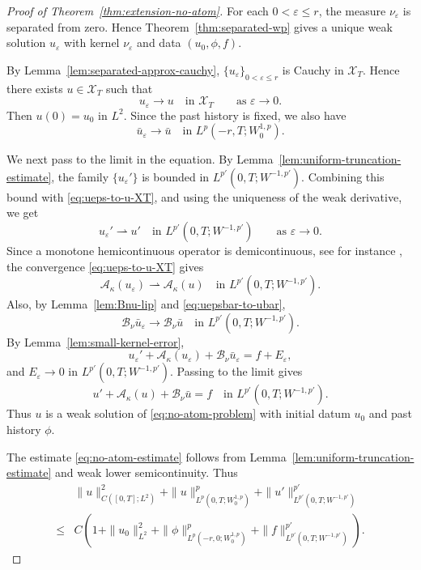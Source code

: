 \documentclass[a4paper,11pt,oneside,reqno]{amsart}
\newcounter{c}
\newcounter{d}
\newcounter{b}
\newcommand{\e}{\varepsilon}
\begin{document}
\begin{proof}[Proof of Theorem~\ref{thm:extension-no-atom}]
For each \(0<\e\le r\), the measure \(\nu_\e\) is separated from zero.
Hence Theorem~\ref{thm:separated-wp} gives a unique weak solution \(u_\e\)
with kernel \(\nu_\e\) and data \((u_0,\phi,f)\).

By Lemma~\ref{lem:separated-approx-cauchy}, \(\{u_\e\}_{0<\e\le r}\) is
Cauchy in \(\mathcal X_T\). Hence there exists \(u\in\mathcal X_T\) such that
\begin{equation}
 u_\e\to u
 \quad\text{in }\mathcal X_T
 \qquad\text{as }\e\to0 .
 \label{eq:ueps-to-u-XT}
\end{equation}
Then \(u(0)=u_0\) in \(L^2\). Since the past history is fixed, we also have
\begin{equation}
 \bar u_\e\to\bar u
 \quad\text{in }L^p(-r,T;W^{1,p}_0).
 \label{eq:uepsbar-to-ubar}
\end{equation}

We next pass to the limit in the equation. By
Lemma~\ref{lem:uniform-truncation-estimate}, the family \(\{u_\e'\}\) is
bounded in \(L^{p'}(0,T;W^{-1,p'})\). Combining this bound with
\eqref{eq:ueps-to-u-XT}, and using the uniqueness of the weak derivative, we
get
\[
 u_\e'\rightharpoonup u'
 \quad\text{in }L^{p'}(0,T;W^{-1,p'})
 \qquad\text{as }\e\to0 .
\]
Since a monotone hemicontinuous operator is demicontinuous, see for instance
\cite[Chapter~II, Section~2]{Showalter1997MonotoneOperatorsBanachSpaceNonlinearPDE}, the convergence
\eqref{eq:ueps-to-u-XT} gives
\[
 \mathcal A_\kappa(u_\e)
 \rightharpoonup
 \mathcal A_\kappa(u)
 \quad\text{in }L^{p'}(0,T;W^{-1,p'}).
\]
Also, by Lemma~\ref{lem:Bnu-lip} and \eqref{eq:uepsbar-to-ubar},
\[
 \mathcal B_\nu\bar u_\e
 \to
 \mathcal B_\nu\bar u
 \quad\text{in }L^{p'}(0,T;W^{-1,p'}).
\]
By Lemma~\ref{lem:small-kernel-error},
\[
 u_\e'
 +
 \mathcal A_\kappa(u_\e)
 +
 \mathcal B_\nu\bar u_\e
 =
 f+E_\e ,
\]
and \(E_\e\to0\) in \(L^{p'}(0,T;W^{-1,p'})\). Passing to the limit gives
\[
 u'
 +
 \mathcal A_\kappa(u)
 +
 \mathcal B_\nu\bar u
 =
 f
 \quad\text{in }L^{p'}(0,T;W^{-1,p'}).
\]
Thus \(u\) is a weak solution of \eqref{eq:no-atom-problem} with initial
datum \(u_0\) and past history \(\phi\).

The estimate \eqref{eq:no-atom-estimate} follows from
Lemma~\ref{lem:uniform-truncation-estimate} and weak lower semicontinuity. Thus
\[
\begin{aligned}
 &\|u\|_{C([0,T];L^2)}^2
 +\|u\|_{L^p(0,T;W^{1,p}_0)}^p
 +\|u'\|_{L^{p'}(0,T;W^{-1,p'})}^{p'} \\
 \le{}&
 C\left(
 1+\|u_0\|_{L^2}^2
 +\|\phi\|_{L^p(-r,0;W^{1,p}_0)}^p
 +\|f\|_{L^{p'}(0,T;W^{-1,p'})}^{p'}
 \right).
\end{aligned}
\]


\end{proof}
\end{document}
